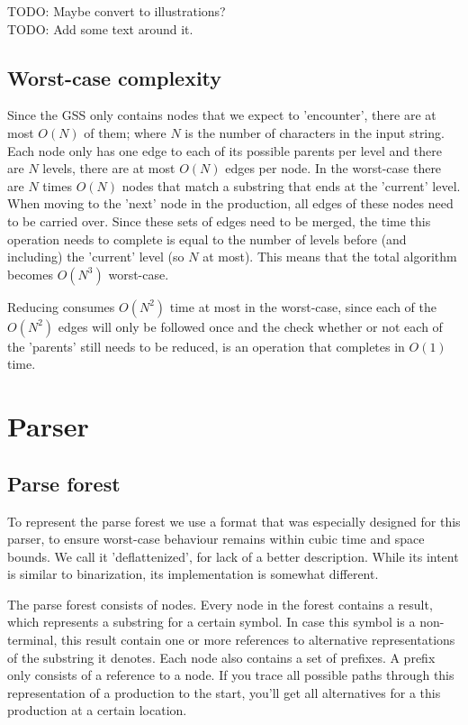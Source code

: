 \documentclass[a4paper,10pt]{article}
\begin{document}
TODO: Maybe convert to illustrations?\\
TODO: Add some text around it.

\subsection{Worst-case complexity}

Since the GSS only contains nodes that we expect to 'encounter', there are at most $O(N)$ of them; where $N$ is the number of characters in the input string. Each node only has one edge to each of its possible parents per level and there are $N$ levels, there are at most $O(N)$ edges per node. In the worst-case there are $N$ times $O(N)$ nodes that match a substring that ends at the 'current' level. When moving to the 'next' node in the production, all edges of these nodes need to be carried over. Since these sets of edges need to be merged, the time this operation needs to complete is equal to the number of levels before (and including) the 'current' level (so $N$ at most). This means that the total algorithm becomes $O(N^3)$ worst-case.

Reducing consumes $O(N^2)$ time at most in the worst-case, since each of the $O(N^2)$ edges will only be followed once and the check whether or not each of the 'parents' still needs to be reduced, is an operation that completes in $O(1)$ time.

\section{Parser}

\subsection{Parse forest}

To represent the parse forest we use a format that was especially designed for this parser, to ensure worst-case behaviour remains within cubic time and space bounds. We call it 'deflattenized', for lack of a better description. While its intent is similar to binarization, its implementation is somewhat different.

The parse forest consists of nodes. Every node in the forest contains a result, which represents a substring for a certain symbol. In case this symbol is a non-terminal, this result contain one or more references to alternative representations of the substring it denotes. Each node also contains a set of prefixes. A prefix only consists of a reference to a node. If you trace all possible paths through this representation of a production to the start, you'll get all alternatives for a this production at a certain location.
\end{document}
